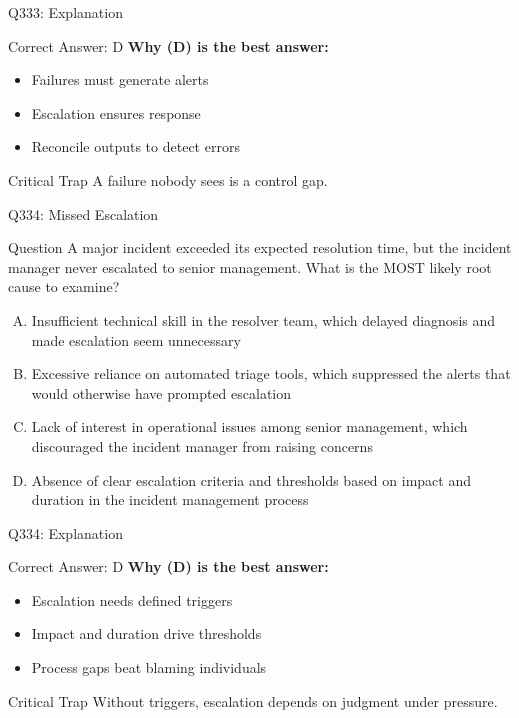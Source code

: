\documentclass{beamer}
\begin{document}
	\begin{frame}{Q333: Explanation}
		\begin{block}{Correct Answer: D}
			\textbf{Why (D) is the best answer:}
			\begin{itemize}
				\item Failures must generate alerts
				\item Escalation ensures response
				\item Reconcile outputs to detect errors
			\end{itemize}
		\end{block}
		\begin{alertblock}{Critical Trap}
			A failure nobody sees is a control gap.
		\end{alertblock}
	\end{frame}
	
	\begin{frame}{Q334: Missed Escalation}
		\begin{block}{Question}
			\small A major incident exceeded its expected resolution time, but the incident manager never escalated to senior management. What is the MOST likely root cause to examine?
		\end{block}
		\begin{enumerate}[(A)]
			\footnotesize
			\item Insufficient technical skill in the resolver team, which delayed diagnosis and made escalation seem unnecessary
			\item Excessive reliance on automated triage tools, which suppressed the alerts that would otherwise have prompted escalation
			\item Lack of interest in operational issues among senior management, which discouraged the incident manager from raising concerns
			\item Absence of clear escalation criteria and thresholds based on impact and duration in the incident management process
		\end{enumerate}
	\end{frame}
	
	\begin{frame}{Q334: Explanation}
		\begin{block}{Correct Answer: D}
			\textbf{Why (D) is the best answer:}
			\begin{itemize}
				\item Escalation needs defined triggers
				\item Impact and duration drive thresholds
				\item Process gaps beat blaming individuals
			\end{itemize}
		\end{block}
		\begin{alertblock}{Critical Trap}
			Without triggers, escalation depends on judgment under pressure.
		\end{alertblock}
	\end{frame}
	
\end{document}
